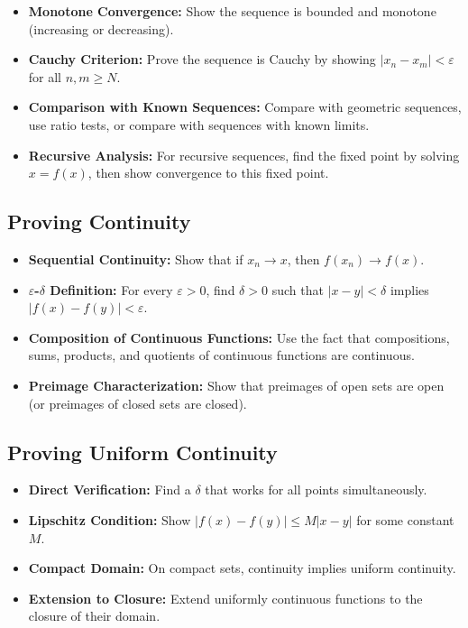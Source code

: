 \begin{itemize}
\item \textbf{Monotone Convergence:} Show the sequence is bounded and monotone (increasing or decreasing).

\item \textbf{Cauchy Criterion:} Prove the sequence is Cauchy by showing $|x_n - x_m| < \varepsilon$ for all $n, m \geq N$.

\item \textbf{Comparison with Known Sequences:} Compare with geometric sequences, use ratio tests, or compare with sequences with known limits.

\item \textbf{Recursive Analysis:} For recursive sequences, find the fixed point by solving $x = f(x)$, then show convergence to this fixed point.
\end{itemize}

\subsection*{Proving Continuity}

\begin{itemize}
\item \textbf{Sequential Continuity:} Show that if $x_n \to x$, then $f(x_n) \to f(x)$.

\item \textbf{$\varepsilon$-$\delta$ Definition:} For every $\varepsilon > 0$, find $\delta > 0$ such that $|x - y| < \delta$ implies $|f(x) - f(y)| < \varepsilon$.

\item \textbf{Composition of Continuous Functions:} Use the fact that compositions, sums, products, and quotients of continuous functions are continuous.

\item \textbf{Preimage Characterization:} Show that preimages of open sets are open (or preimages of closed sets are closed).
\end{itemize}

\subsection*{Proving Uniform Continuity}

\begin{itemize}
\item \textbf{Direct Verification:} Find a $\delta$ that works for all points simultaneously.

\item \textbf{Lipschitz Condition:} Show $|f(x) - f(y)| \leq M|x - y|$ for some constant $M$.

\item \textbf{Compact Domain:} On compact sets, continuity implies uniform continuity.

\item \textbf{Extension to Closure:} Extend uniformly continuous functions to the closure of their domain.
\end{itemize}

